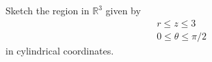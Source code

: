 \begin{problem}
Sketch the region in $\mathbb{R}^3$ given by
\begin{align*}
&r\leq z\leq 3\\
&0\leq\theta \leq\pi/2
\end{align*}
in cylindrical coordinates.
\end{problem}